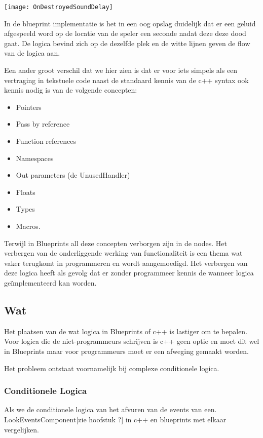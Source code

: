 \texttt{[image: OnDestroyedSoundDelay]}

In de blueprint implementatie is het in een oog opslag duidelijk dat er een geluid afgespeeld word op de locatie van de speler een seconde nadat deze deze dood gaat. De logica bevind zich op de dezelfde plek en de witte lijnen geven de flow van de logica aan. 

Een ander groot verschil dat we hier zien is dat er voor iets simpels als een vertraging in tekstuele code naast de standaard kennis van de c++ syntax ook kennis nodig is van de volgende concepten:

\begin{itemize}
	\item Pointers
	\item Pass by reference
	\item Function references
	\item Namespaces
	\item Out parameters (de UnusedHandler)
	\item Floats
	\item Types
	\item Macros. 
\end{itemize}

Terwijl in Blueprints all deze concepten verborgen zijn in de nodes. Het verbergen van de onderliggende werking van functionaliteit is een thema wat vaker terugkomt in programmeren en wordt aangemoedigd. Het verbergen van deze logica heeft als gevolg dat er zonder programmeer kennis de wanneer logica geïmplementeerd kan worden.

\subsection{Wat}

Het plaatsen van de wat logica in Blueprints of c++ is lastiger om te bepalen. Voor logica die de niet-programmeurs schrijven is c++ geen optie en moet dit wel in Blueprints maar voor programmeurs moet er een afweging gemaakt worden.

Het probleem ontstaat voornamelijk bij complexe conditionele logica.

\subsubsection{Conditionele Logica}

Als we de conditionele logica van het afvuren van de events van een.
LookEventsComponent[zie hoofstuk ?] in c++ en blueprints met elkaar vergelijken.

